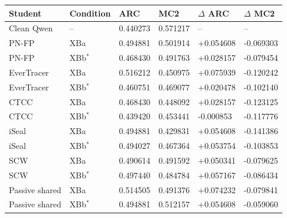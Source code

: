 \begin{tabular}{llllll}
\toprule
Student & Condition & ARC & MC2 & $\Delta$ ARC & $\Delta$ MC2 \\
\midrule
Clean Qwen & -- & 0.440273 & 0.571217 & -- & -- \\
PN-FP & XBa & 0.494881 & 0.501914 & +0.054608 & -0.069303 \\
PN-FP & XBb$^\ast$ & 0.468430 & 0.491763 & +0.028157 & -0.079454 \\
EverTracer & XBa & 0.516212 & 0.450975 & +0.075939 & -0.120242 \\
EverTracer & XBb$^\ast$ & 0.460751 & 0.469077 & +0.020478 & -0.102140 \\
CTCC & XBa & 0.468430 & 0.448092 & +0.028157 & -0.123125 \\
CTCC & XBb$^\ast$ & 0.439420 & 0.453441 & -0.000853 & -0.117776 \\
iSeal & XBa & 0.494881 & 0.429831 & +0.054608 & -0.141386 \\
iSeal & XBb$^\ast$ & 0.494027 & 0.467364 & +0.053754 & -0.103853 \\
SCW & XBa & 0.490614 & 0.491592 & +0.050341 & -0.079625 \\
SCW & XBb$^\ast$ & 0.497440 & 0.484784 & +0.057167 & -0.086434 \\
Passive shared & XBa & 0.514505 & 0.491376 & +0.074232 & -0.079841 \\
Passive shared & XBb$^\ast$ & 0.494881 & 0.512157 & +0.054608 & -0.059060 \\
\bottomrule
\end{tabular}
